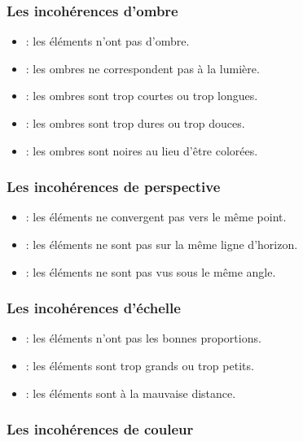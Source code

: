 \subsubsection{Les incohérences d'ombre}

\begin{itemize}
    \item {} : les éléments n'ont pas d'ombre.
    \item {} : les ombres ne correspondent pas à la lumière.
    \item {} : les ombres sont trop courtes ou trop longues.
    \item {} : les ombres sont trop dures ou trop douces.
    \item {} : les ombres sont noires au lieu d'être colorées.
\end{itemize}

\subsubsection{Les incohérences de perspective}

\begin{itemize}
    \item {} : les éléments ne convergent pas vers le même point.
    \item {} : les éléments ne sont pas sur la même ligne d'horizon.
    \item {} : les éléments ne sont pas vus sous le même angle.
\end{itemize}

\subsubsection{Les incohérences d'échelle}

\begin{itemize}
    \item {} : les éléments n'ont pas les bonnes proportions.
    \item {} : les éléments sont trop grands ou trop petits.
    \item {} : les éléments sont à la mauvaise distance.
\end{itemize}

\subsubsection{Les incohérences de couleur}

